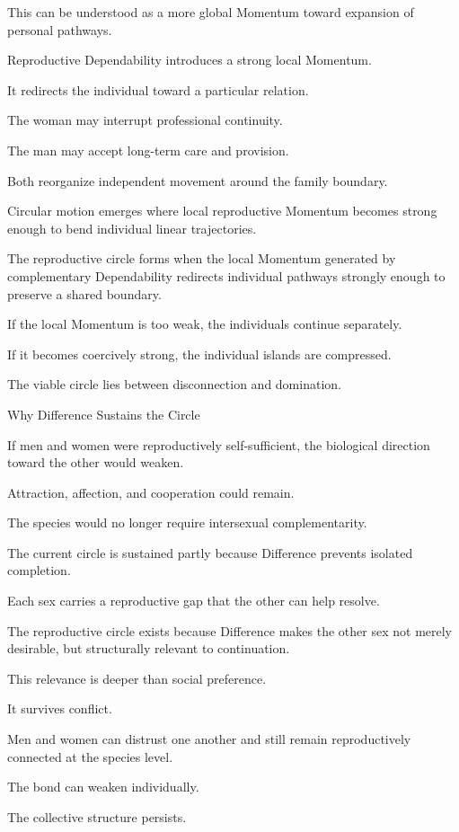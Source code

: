 This can be understood as a more global Momentum toward expansion of personal pathways.

Reproductive Dependability introduces a strong local Momentum.

It redirects the individual toward a particular relation.

The woman may interrupt professional continuity.

The man may accept long-term care and provision.

Both reorganize independent movement around the family boundary.

Circular motion emerges where local reproductive Momentum becomes strong enough to bend individual linear trajectories.

The reproductive circle forms when the local Momentum generated by complementary Dependability redirects individual pathways strongly enough to preserve a shared boundary.

If the local Momentum is too weak, the individuals continue separately.

If it becomes coercively strong, the individual islands are compressed.

The viable circle lies between disconnection and domination.

Why Difference Sustains the Circle

If men and women were reproductively self-sufficient, the biological direction toward the other would weaken.

Attraction, affection, and cooperation could remain.

The species would no longer require intersexual complementarity.

The current circle is sustained partly because Difference prevents isolated completion.

Each sex carries a reproductive gap that the other can help resolve.

The reproductive circle exists because Difference makes the other sex not merely desirable, but structurally relevant to continuation.

This relevance is deeper than social preference.

It survives conflict.

Men and women can distrust one another and still remain reproductively connected at the species level.

The bond can weaken individually.

The collective structure persists.

